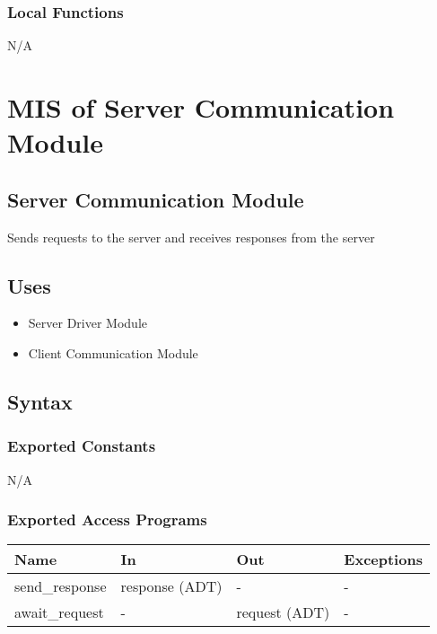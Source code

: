 \documentclass[12pt, titlepage]{article}
\begin{document}
\subsubsection{Local Functions}
N/A

\section{MIS of Server Communication Module} 

\subsection{Server Communication Module}
Sends requests to the server and receives responses from the server

\subsection{Uses}
\begin{itemize}
  \item Server Driver Module
  \item Client Communication Module
\end{itemize}

\subsection{Syntax}

\subsubsection{Exported Constants}
N/A

\subsubsection{Exported Access Programs}

\begin{center}
\begin{tabular}{p{3cm} p{3cm} p{3cm} p{2cm}}
\hline
\textbf{Name} & \textbf{In} & \textbf{Out} & \textbf{Exceptions}\\
\hline%
send\_response & response (ADT) &- &-\\
await\_request &- &request (ADT) &-\\
\hline
\end{tabular}
\end{center}
\end{document}
